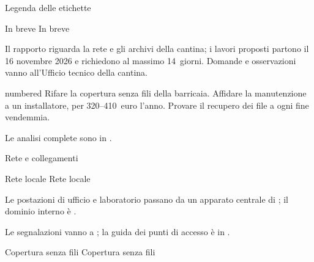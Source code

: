 \documentclass[a4paper,11pt]{article}
\begin{document}
\RdTitlePage
\RdTableOfContents
\begin{RdLegend}{Legenda delle etichette}
\end{RdLegend}


{In breve}
{In breve}

Il rapporto riguarda la rete e gli archivi della cantina; i lavori proposti partono
il 16 novembre 2026 e richiedono al massimo 14~giorni. Domande e osservazioni vanno
all’Ufficio tecnico della cantina.
\par
\begin{RdList}{numbered}
\RdItem Rifare la copertura senza fili della barricaia.
\RdItem Affidare la manutenzione a un installatore, per 320–410~euro l’anno.
\RdItem Provare il recupero dei file a ogni fine vendemmia.
\end{RdList}

Le analisi complete sono in .
\par

{Rete e collegamenti}

{Rete locale}
{Rete locale}

 Le  postazioni di ufficio e laboratorio passano
da un apparato centrale di ; il dominio interno è .
\par

Le segnalazioni vanno a ;
la guida dei punti di accesso è in .
\par

{Copertura senza fili}
{Copertura senza fili}
\end{document}
